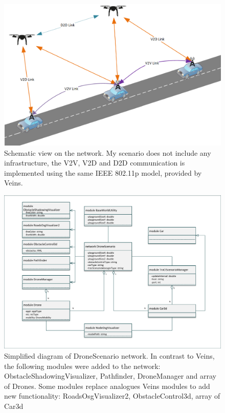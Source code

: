 \documentclass[]{nsm-thesis}
\begin{document}

\begin{figure}
	\centering
	\includegraphics[width=1\textwidth]{figures/VANET scheme.png}
	\caption{Schematic view on the network. My scenario does not include any infrastructure, the \ac{V2V}, \ac{V2D} and \ac{D2D} communication is implemented using the same IEEE 802.11p model, provided by Veins.}
	\label{fig:vanetscheme}
\end{figure}

\begin{figure}
	\centering
	\includegraphics[width=1\textwidth]{figures/DroneScenario.pdf}
	\caption{Simplified diagram of DroneScenario network. In contrast to Veins, the following modules were added to the network: ObstacleShadowingVisualizer, Pathfinder, DroneManager and array of Drones. Some modules replace analogues Veins modules to add new functionality: RoadsOsgVisualizer2, ObstacleControl3d, array of Car3d}
	\label{fig:dronescenarioned}
\end{figure}
\end{document}
